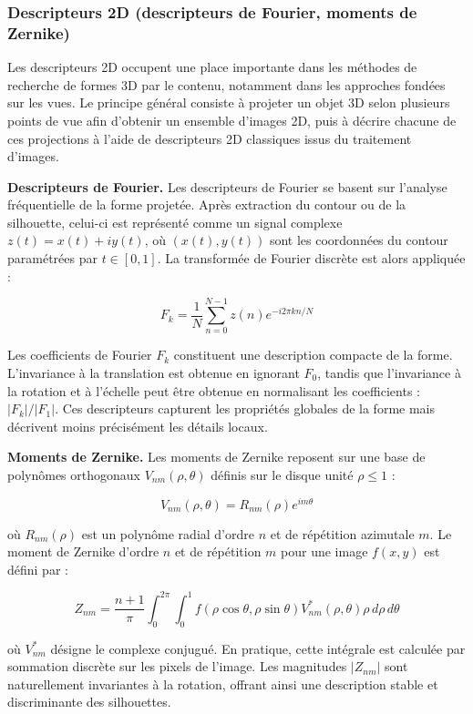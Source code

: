 \documentclass[11pt,a4paper,oneside]{report}
\begin{document}
\subsubsection{Descripteurs 2D (descripteurs de Fourier, moments de Zernike)}

Les descripteurs 2D occupent une place importante dans les méthodes de recherche de formes 3D par le contenu, notamment dans les approches fondées sur les vues. Le principe général consiste à projeter un objet 3D selon plusieurs points de vue afin d'obtenir un ensemble d'images 2D, puis à décrire chacune de ces projections à l'aide de descripteurs 2D classiques issus du traitement d'images.

\textbf{Descripteurs de Fourier.} Les descripteurs de Fourier se basent sur l'analyse fréquentielle de la forme projetée. Après extraction du contour ou de la silhouette, celui-ci est représenté comme un signal complexe $z(t) = x(t) + iy(t)$, où $(x(t), y(t))$ sont les coordonnées du contour paramétrées par $t \in [0, 1]$. La transformée de Fourier discrète est alors appliquée :

$$
F_k = \frac{1}{N} \sum_{n=0}^{N-1} z(n) e^{-i2\pi kn/N}
$$

Les coefficients de Fourier $F_k$ constituent une description compacte de la forme. L'invariance à la translation est obtenue en ignorant $F_0$, tandis que l'invariance à la rotation et à l'échelle peut être obtenue en normalisant les coefficients : $|F_k| / |F_1|$. Ces descripteurs capturent les propriétés globales de la forme mais décrivent moins précisément les détails locaux.

\textbf{Moments de Zernike.} Les moments de Zernike reposent sur une base de polynômes orthogonaux $V_{nm}(\rho, \theta)$ définis sur le disque unité $\rho \leq 1$ :

$$
V_{nm}(\rho, \theta) = R_{nm}(\rho) e^{im\theta}
$$

où $R_{nm}(\rho)$ est un polynôme radial d'ordre $n$ et de répétition azimutale $m$. Le moment de Zernike d'ordre $n$ et de répétition $m$ pour une image $f(x,y)$ est défini par :

$$
Z_{nm} = \frac{n+1}{\pi} \int_0^{2\pi} \int_0^1 f(\rho\cos\theta, \rho\sin\theta) V_{nm}^*(\rho, \theta) \rho \, d\rho \, d\theta
$$

où $V_{nm}^*$ désigne le complexe conjugué. En pratique, cette intégrale est calculée par sommation discrète sur les pixels de l'image. Les magnitudes $|Z_{nm}|$ sont naturellement invariantes à la rotation, offrant ainsi une description stable et discriminante des silhouettes. \\
\end{document}
